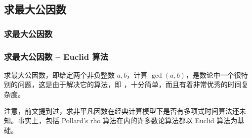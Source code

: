 \documentclass{../pkslide}
\begin{document}

\subsection{求最大公因数}
\subsubsection*{求最大公因数}


\begin{frame}
  \frametitle{求最大公因数 -- Euclid 算法}
  
  求最大公因数，即给定两个非负整数 $a, b$，计算 $\gcd(a, b)$，是数论中一个很特别的问题，这是由于解决它的算法，即 ，十分简单，而且有着非常优秀的时间复杂度。
  
  \emptyline
  
  注意，前文提到过，求非平凡因数在经典计算模型下是否有多项式时间算法还未知。事实上，包括 Pollard's rho 算法在内的许多数论算法都以 Euclid 算法为基础。
\end{frame}
\end{document}
